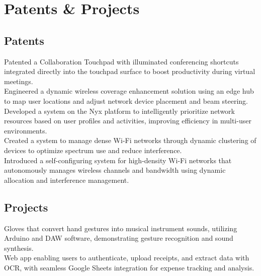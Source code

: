 \documentclass[]{resume-openfont}
\begin{document}
    \begin{minipage}[t]{1\textwidth}
        \section{Patents \& Projects}
        \sectiontitlerule
        
        \begin{patents_and_projects_section}
            \subsection{Patents}
            Patented a Collaboration Touchpad with illuminated conferencing shortcuts integrated directly into the touchpad surface to boost productivity during virtual meetings.\\
            Engineered a dynamic wireless coverage enhancement solution using an edge hub to map user locations and adjust network device placement and beam steering.\\
            Developed a system on the Nyx platform to intelligently prioritize network resources based on user profiles and activities, improving efficiency in multi-user environments.\\
            Created a system to manage dense Wi-Fi networks through dynamic clustering of devices to optimize spectrum use and reduce interference.\\
            Introduced a self-configuring system for high-density Wi-Fi networks that autonomously manages wireless channels and bandwidth using dynamic allocation and interference management.\\
        \end{patents_and_projects_section}
        
        \begin{patents_and_projects_section}
            \subsection{Projects}
            Gloves that convert hand gestures into musical instrument sounds, utilizing Arduino and DAW software, demonstrating gesture recognition and sound synthesis.\\
            Web app enabling users to authenticate, upload receipts, and extract data with OCR, with seamless Google Sheets integration for expense tracking and analysis.\\
        \end{patents_and_projects_section}
    \end{minipage}
\end{document}
